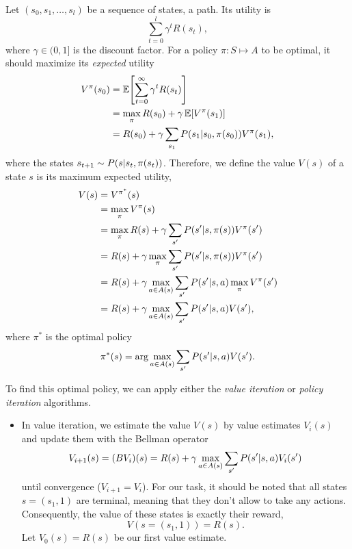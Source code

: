 \documentclass[11pt, a4paper]{article}
\begin{document}
\begin{enumerate}
    \begin{solution}
        Let $(s_0, s_1, \dots, s_l)$ be a sequence of states, \ie{} a path. Its utility is
        \begin{equation*}
            \sum_{t = 0}^{l} \gamma^t R(s_t),
        \end{equation*}
        where $\gamma \in (0, 1]$ is the discount factor. For a policy $\pi : S \mapsto A$ to be optimal, it should maximize its \emph{expected} utility
        \begin{align*}
            V^\pi(s_0) & = \E \sbk*{\sum_{t = 0}^\infty \gamma^t R(s_t)} \\
            & = \max_\pi R(s_0) + \gamma \, \E \sbk*{V^\pi(s_1)} \\
            & = R(s_0) + \gamma \sum_{s_1} P(s_1 \knowing s_0, \pi(s_0)) V^\pi(s_1),
        \end{align*}
        where the states $s_{t+1} \sim P(s \vert s_t, \pi(s_t))$. Therefore, we define the value $V(s)$ of a state $s$ is its maximum expected utility, \ie{}
        \begin{align*}
            V(s) & = V^{\pi^*}(s) \\
            & = \max_\pi V^\pi(s) \\
            & = \max_\pi R(s) + \gamma \sum_{s'} P(s' \vert s, \pi(s)) V^\pi(s') \\
            & = R(s) + \gamma \max_\pi \sum_{s'} P(s' \vert s, \pi(s)) V^\pi(s') \\
            & = R(s) + \gamma \max_{a \in A(s)} \sum_{s'} P(s' \vert s, a) \max_\pi V^\pi(s') \\
            & = R(s) + \gamma \max_{a \in A(s)} \sum_{s'} P(s' \vert s, a) V(s') ,
        \end{align*}
        where $\pi^*$ is the optimal policy
        \begin{align*}
            \pi^*(s) = \arg \max_{a \in A(s)} \sum_{s'} P(s' \vert s, a) V(s') .
        \end{align*}

        To find this optimal policy, we can apply either the \emph{value iteration} or \emph{policy iteration} algorithms.

        \begin{itemize}
            \item In value iteration, we estimate the value $V(s)$ by value estimates $V_i(s)$ and update them with the Bellman operator
            \begin{equation*}
                V_{i+1}(s) = (B V_i)(s) = R(s) + \gamma \max_{a \in A(s)} \sum_{s'} P(s' \vert s, a) V_{i}(s')
            \end{equation*}
            until convergence ($V_{i + 1} = V_i$). For our task, it should be noted that all states $s = (s_1, 1)$ are terminal, meaning that they don't allow to take any actions. Consequently, the value of these states is exactly their reward, \ie{}
            \begin{equation*}
                V(s = (s_1, 1)) = R(s) .
            \end{equation*}
            Let $V_0(s) = R(s)$ be our first value estimate.


\end{itemize}
\end{solution}
\end{enumerate}
\end{document}
